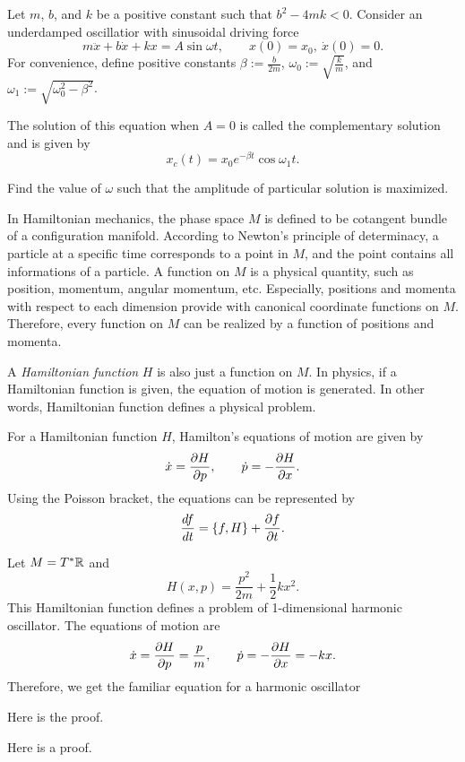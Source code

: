 \documentclass{../prb}
\begin{document}
\begin{prb}
Let $m$, $b$, and $k$ be a positive constant such that $b^2-4mk<0$.
Consider an underdamped oscillatior with sinusoidal driving force
\[m\ddot x+b\dot x+kx=A\sin\omega t,\qquad x(0)=x_0,\ \dot x(0)=0.\]
For convenience, define positive constants $\beta:=\frac b{2m}$, $\omega_0:=\sqrt{\frac km}$, and $\omega_1:=\sqrt{\omega_0^2-\beta^2}$.

The solution of this equation when $A=0$ is called the complementary solution and is given by
\[x_c(t)=x_0e^{-\beta t}\cos\omega_1t.\]
\begin{cond}
\item
\item Find the value of $\omega$ such that the amplitude of particular solution is maximized.
\end{cond}
\end{prb}



\clearpage
In Hamiltonian mechanics, the phase space $M$ is defined to be cotangent bundle of a configuration manifold.
According to Newton's principle of determinacy, a particle at a specific time corresponds to a point in $M$, and the point contains all informations of a particle.
A function on $M$ is a physical quantity, such as position, momentum, angular momentum, etc.
Especially, positions and momenta with respect to each dimension provide with canonical coordinate functions on $M$.
Therefore, every function on $M$ can be realized by a function of positions and momenta.

A \emph{Hamiltonian function} $H$ is also just a function on $M$.
In physics, if a Hamiltonian function is given, the equation of motion is generated.
In other words, Hamiltonian function defines a physical problem.

\begin{defn}
For a Hamiltonian function $H$, Hamilton's equations of motion are given by
\[\dot x=\pd{H}{p},\qquad\dot p=-\pd{H}{x}.\]
Using the Poisson bracket, the equations can be represented by
\[\dd{f}{t} = \{f,H\} + \pd{f}{t}.\]
\end{defn}

\begin{prb}
Let $M=T^*\mathbb{R}$ and
\[H(x,p)=\frac{p^2}{2m}+\frac12kx^2.\]
This Hamiltonian function defines a problem of 1-dimensional harmonic oscillator.
The equations of motion are
\[\dot x=\pd{H}{p}=\frac pm,\qquad\dot p=-\pd{H}{x}=-kx.\]
Therefore, we get the familiar equation for a harmonic oscillator
\end{prb}
\begin{sol}
\item Here is the proof.
\item Here is a proof.
\end{sol}
\end{document}
